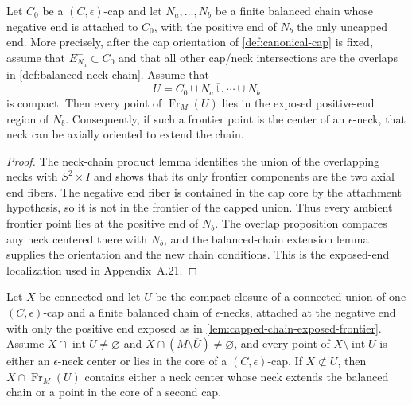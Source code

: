 \begin{lemma}
\label{lem:capped-chain-exposed-frontier}
\notready
Let $C_0$ be a $(C,\epsilon)$-cap and let
$N_a,\ldots,N_b$ be a finite balanced chain whose negative end is attached to
$C_0$, with the positive end of $N_b$ the only uncapped end.  More precisely,
after the cap orientation of \ref{def:canonical-cap} is fixed, assume that
$E_{N_a}^-\subset C_0$ and that all other cap/neck intersections are the
overlaps in \ref{def:balanced-neck-chain}.  Assume that
\[
U=\overline{C_0\cup N_a\cup\cdots\cup N_b}
\]
is compact.  Then every point of
$\operatorname{Fr}_M(U)$ lies in the exposed positive-end region of $N_b$.
Consequently, if such a frontier point is the center of an
$\epsilon$-neck, that neck can be axially oriented to extend the chain.
\end{lemma}

\begin{proof}
The neck-chain product lemma identifies the union of the overlapping necks
with $S^2\times I$ and shows that its only frontier components are the two
axial end fibers.  The negative end fiber is contained in the cap core by the
attachment hypothesis, so it is not in the frontier of the capped union.
Thus every ambient frontier point lies at the positive end of $N_b$.  The
overlap proposition compares any neck centered there with $N_b$, and the
balanced-chain extension lemma supplies the orientation and the new chain
conditions.  This is the exposed-end localization used in Appendix~A.21.
\end{proof}

\begin{lemma}
\label{lem:finite-cap-chain-frontier-dichotomy}
\notready
Let $X$ be connected and let $U$ be the compact closure of a connected union
of one $(C,\epsilon)$-cap and a finite balanced chain of $\epsilon$-necks,
attached at the negative end with only the positive end exposed as in
\ref{lem:capped-chain-exposed-frontier}.
Assume $X\cap\operatorname{int}U\ne\varnothing$ and
$X\cap(M\setminus\overline U)\ne\varnothing$, and every point of
$X\setminus\operatorname{int}U$ is either an $\epsilon$-neck center or lies in
the core of a $(C,\epsilon)$-cap.  If $X\not\subset U$, then
$X\cap\operatorname{Fr}_M(U)$ contains either a neck center whose neck extends
the balanced chain or a point in the core of a second cap.
\end{lemma}

